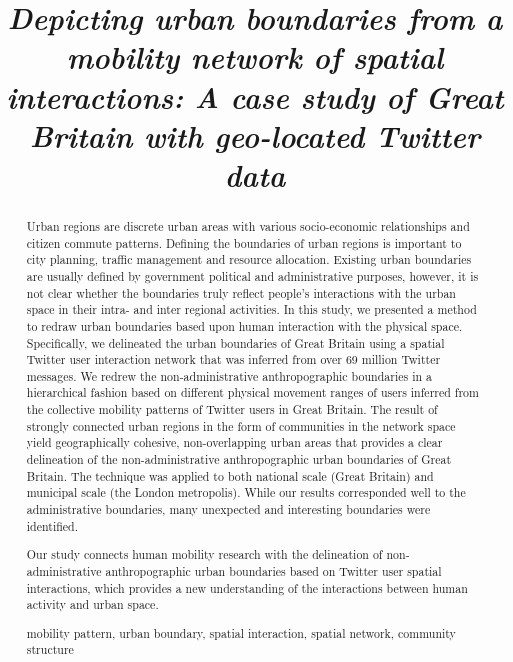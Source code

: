 \documentclass[]{tGIS2e}
\begin{document}



\title{{\itshape Depicting urban boundaries from a mobility network of spatial interactions: A case study of Great Britain with geo-located Twitter data} }
\maketitle

\begin{abstract}
Urban regions are discrete urban areas with various socio-economic relationships and citizen commute patterns.
Defining the boundaries of urban regions is important to city planning, traffic management and resource allocation.
Existing urban boundaries are usually defined by government political and administrative purposes, however, it is not clear whether the boundaries truly reflect people's interactions with the urban space in their intra- and inter regional activities.
In this study, we presented a method to redraw urban boundaries based upon human interaction with the physical space.
Specifically, we delineated the urban boundaries of Great Britain using a spatial Twitter user interaction network that was inferred from over 69 million Twitter messages.
We redrew the non-administrative anthropographic boundaries in a hierarchical fashion based on different physical movement ranges of users inferred from the collective mobility patterns of Twitter users in Great Britain.
The result of strongly connected urban regions in the form of communities in the network space yield geographically cohesive, non-overlapping urban areas that provides a clear delineation of the non-administrative anthropographic urban boundaries of Great Britain.
The technique was applied to both national scale (Great Britain) and municipal scale (the London metropolis). 
While our results corresponded well to the administrative boundaries, many unexpected and interesting boundaries were identified.

Our study connects human mobility research with the delineation of non-administrative anthropographic urban boundaries based on Twitter user spatial interactions, which provides a new understanding of the interactions between human activity and urban space.
\newline

 mobility pattern, urban boundary, spatial interaction, spatial network, community structure
\end{abstract}
\end{document}
